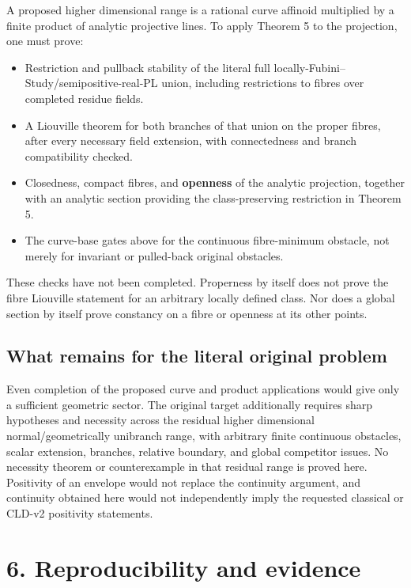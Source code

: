 \documentclass[
  11pt,
]{article}
\providecommand{\tightlist}{%
  \setlength{\itemsep}{0pt}\setlength{\parskip}{0pt}}
\begin{document}
A proposed higher dimensional range is a rational curve affinoid
multiplied by a finite product of analytic projective lines. To apply
Theorem 5 to the projection, one must prove:

\begin{itemize}
\tightlist
\item
  Restriction and pullback stability of the literal full
  locally-Fubini--Study/semipositive-real-PL union, including
  restrictions to fibres over completed residue fields.
\item
  A Liouville theorem for both branches of that union on the proper
  fibres, after every necessary field extension, with connectedness and
  branch compatibility checked.
\item
  Closedness, compact fibres, and \textbf{openness} of the analytic
  projection, together with an analytic section providing the
  class-preserving restriction in Theorem 5.
\item
  The curve-base gates above for the continuous fibre-minimum obstacle,
  not merely for invariant or pulled-back original obstacles.
\end{itemize}

These checks have not been completed. Properness by itself does not
prove the fibre Liouville statement for an arbitrary locally defined
class. Nor does a global section by itself prove constancy on a fibre or
openness at its other points.

\subsection{What remains for the literal original
problem}\label{what-remains-for-the-literal-original-problem}

Even completion of the proposed curve and product applications would
give only a sufficient geometric sector. The original target
additionally requires sharp hypotheses and necessity across the residual
higher dimensional normal/geometrically unibranch range, with arbitrary
finite continuous obstacles, scalar extension, branches, relative
boundary, and global competitor issues. No necessity theorem or
counterexample in that residual range is proved here. Positivity of an
envelope would not replace the continuity argument, and continuity
obtained here would not independently imply the requested classical or
CLD-v2 positivity statements.

\section{6. Reproducibility and
evidence}\label{reproducibility-and-evidence}
\end{document}
